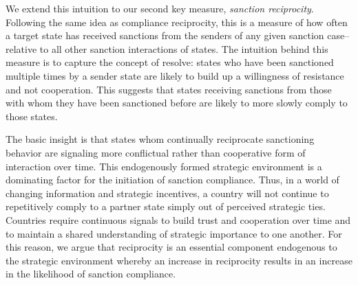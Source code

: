 We extend this intuition to our second key measure, \textit{sanction reciprocity}. Following the same idea as compliance reciprocity, this is a measure of how often a target state has received sanctions from the senders of any given sanction case--relative to all other sanction interactions of states. The intuition behind this measure is to capture the concept of resolve: states who have been sanctioned multiple times by a sender state are likely to build up a willingness of resistance and not cooperation.  This suggests that states receiving sanctions from those with whom they have been sanctioned before are likely to more slowly comply to those states. 

The basic insight is that states whom continually reciprocate sanctioning behavior are signaling more conflictual rather than cooperative form of interaction over time. This endogenously formed strategic environment is a dominating factor for the initiation of sanction compliance. Thus, in a world of changing information and strategic incentives, a country will not continue to repetitively comply to a partner state simply out of perceived strategic ties. Countries require continuous signals to build trust and cooperation over time and to maintain a shared understanding of strategic importance to one another. For this reason, we argue that reciprocity is an essential component endogenous to the strategic environment whereby an increase in reciprocity results in an increase in the likelihood of sanction compliance. 







